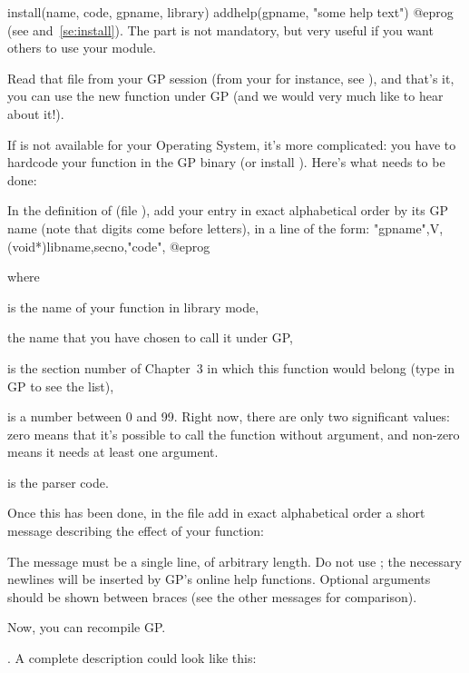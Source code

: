 \bprog
install(name, code, gpname, library)
addhelp(gpname, "some help text")
@eprog
\noindent(see  and~\ref{se:install}). The 
part is not mandatory, but very useful if you want others to use your
module.

Read that file from your GP session (from your  for
instance, see ), and that's it, you can use the new
function  under GP (and we would very much like to hear about
it!).


If  is not available for your Operating System, it's more
complicated: you have to hardcode your function in the GP binary (or
install ). Here's what needs to be done: 

In the definition of  (file ),
add your entry in exact alphabetical order by its GP name (note that digits
come before letters), in a line of the form:
\bprog
{ "gpname",V,(void*)libname,secno,"code"\cbr, }
@eprog

\noindent where

 is the name of your function in library mode,

 the name that you have chosen to call it under GP,

 is the section number of Chapter~3 in which this function would
belong (type  in GP to see the list),

 is a number between 0 and 99. Right now, there are only two
significant values: zero means that it's possible to call the function
without argument, and non-zero means it needs at least one argument.

 is the parser code.

Once this has been done, in the file  add in
exact alphabetical order a short message describing the effect of your
function:

The message must be a single line, of arbitrary length. Do not use
; the necessary newlines will be inserted by GP's online help
functions. Optional arguments should be shown between braces (see the other
messages for comparison).\smallskip

Now, you can recompile GP.

.
%
A complete description could look like this:

